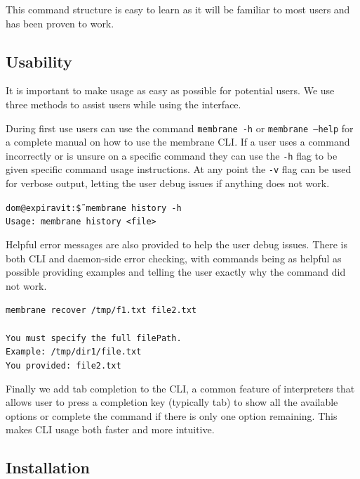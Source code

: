 \documentclass[11pt, a4paper, twoside]{report}
\def\code#1{\texttt{#1}}
\begin{document}
This command structure is easy to learn as it will be familiar to most users and has been proven to work.

\subsection{Usability}

It is important to make usage as easy as possible for potential users. We use three methods to assist users while using the interface.

During first use users can use the command \code{membrane -h} or \code{membrane --help} for a complete manual on how to use the membrane CLI. If a user uses a command incorrectly or is unsure on a specific command they can use the \code{-h} flag to be given specific command usage instructions. At any point the \code{-v} flag can be used for verbose output, letting the user debug issues if anything does not work.

\begin{displayquote}
 \scriptsize
 \code{dom@expiravit:\~\$ membrane history -h} \\
 \code{Usage: membrane history <file>}
\end{displayquote}

Helpful error messages are also provided to help the user debug issues. There is both CLI and daemon-side error checking, with commands being as helpful as possible providing examples and telling the user exactly why the command did not work.

\begin{displayquote}
 \scriptsize
 \code{membrane recover /tmp/f1.txt file2.txt} \\ \\
 \code{You must specify the full filePath.} \\
 \code{Example: /tmp/dir1/file.txt} \\
 \code{You provided: file2.txt}
\end{displayquote}

Finally we add tab completion to the CLI, a common feature of interpreters that allows user to press a completion key (typically tab) to show all the available options or complete the command if there is only one option remaining. This makes CLI usage both faster and more intuitive.

\subsection{Installation}
\end{document}
